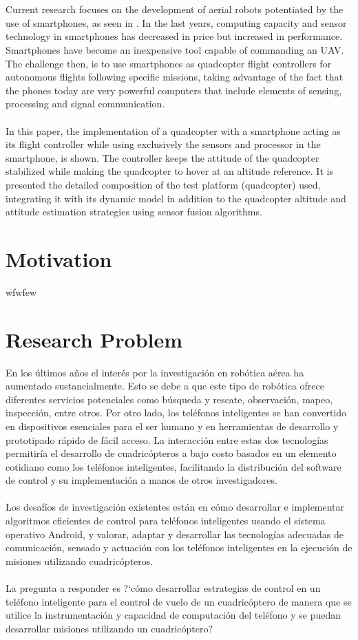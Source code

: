 \\\\
Current research focuses on the development of aerial robots potentiated by the use of smartphones, as seen in \cite{Pearce2014a, ALEMARK2014a, Aldrovandi2015, Bryant2015}. In the last years, computing capacity and sensor technology in smartphones has decreased in price but increased in performance. Smartphones have become an inexpensive tool capable of commanding an UAV. The challenge then, is to use smartphones as quadcopter flight controllers for autonomous flights following specific missions, taking advantage of the fact that the phones today are very powerful computers that include elements of sensing, processing and signal communication.
\\\\
In this paper, the implementation of a quadcopter with a smartphone acting as its flight controller while using exclusively the sensors and processor in the smartphone, is shown. The controller keeps the attitude of the quadcopter stabilized while making the quadcopter to hover at an altitude reference. It is presented the detailed composition of the test platform (quadcopter) used, integrating it with its dynamic model in addition to the quadcopter altitude and attitude estimation strategies using sensor fusion algorithms.
\section{Motivation}
wfwfew
\section{Research Problem}
En los últimos años el interés por la investigación en robótica aérea ha aumentado sustancialmente. Esto se debe a que este tipo de robótica ofrece diferentes servicios potenciales como búsqueda y rescate, observación, mapeo, inspección, entre otros. Por otro lado, los teléfonos inteligentes se han convertido en dispositivos esenciales para el ser humano y en herramientas de desarrollo y prototipado rápido de fácil acceso. La interacción entre estas dos tecnologías permitiría el desarrollo de cuadricópteros a bajo costo basados en un elemento cotidiano como los teléfonos inteligentes, facilitando la distribución del software de control y su implementación a manos de otros investigadores.
\\\\
Los  desafíos  de  investigación  existentes  están en  cómo  desarrollar  e  implementar  algoritmos eficientes de control para teléfonos inteligentes usando el sistema operativo Android, y  valorar,  adaptar  y  desarrollar  las  tecnologías  adecuadas  de  comunicación,  sensado  y actuación con los teléfonos inteligentes en la ejecución de misiones utilizando cuadricópteros.
\\\\
La pregunta a responder es ?`cómo desarrollar estrategias de control en un teléfono inteligente para el control de vuelo de un cuadricóptero de manera que se utilice la instrumentación y capacidad de computación del teléfono y se puedan desarrollar misiones utilizando un cuadricóptero?\\

